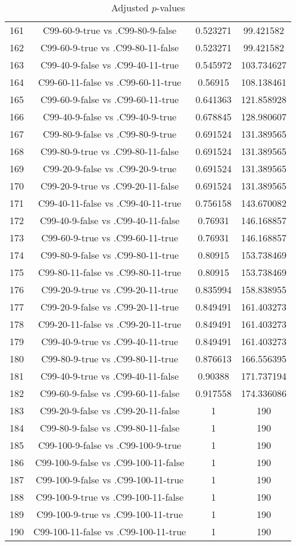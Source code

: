 \documentclass[a4paper,10pt]{article}
\begin{document}
\begin{landscape}
\begin{table}[!htp]
\begin{tabular}{cccc}
161&C99-60-9-true vs .C99-80-9-false&0.523271&99.421582\\
162&C99-60-9-true vs .C99-80-11-false&0.523271&99.421582\\
163&C99-40-9-false vs .C99-40-11-true&0.545972&103.734627\\
164&C99-60-11-false vs .C99-60-11-true&0.56915&108.138461\\
165&C99-60-9-false vs .C99-60-11-true&0.641363&121.858928\\
166&C99-40-9-false vs .C99-40-9-true&0.678845&128.980607\\
167&C99-80-9-false vs .C99-80-9-true&0.691524&131.389565\\
168&C99-80-9-true vs .C99-80-11-false&0.691524&131.389565\\
169&C99-20-9-false vs .C99-20-9-true&0.691524&131.389565\\
170&C99-20-9-true vs .C99-20-11-false&0.691524&131.389565\\
171&C99-40-11-false vs .C99-40-11-true&0.756158&143.670082\\
172&C99-40-9-false vs .C99-40-11-false&0.76931&146.168857\\
173&C99-60-9-true vs .C99-60-11-true&0.76931&146.168857\\
174&C99-80-9-false vs .C99-80-11-true&0.80915&153.738469\\
175&C99-80-11-false vs .C99-80-11-true&0.80915&153.738469\\
176&C99-20-9-true vs .C99-20-11-true&0.835994&158.838955\\
177&C99-20-9-false vs .C99-20-11-true&0.849491&161.403273\\
178&C99-20-11-false vs .C99-20-11-true&0.849491&161.403273\\
179&C99-40-9-true vs .C99-40-11-true&0.849491&161.403273\\
180&C99-80-9-true vs .C99-80-11-true&0.876613&166.556395\\
181&C99-40-9-true vs .C99-40-11-false&0.90388&171.737194\\
182&C99-60-9-false vs .C99-60-11-false&0.917558&174.336086\\
183&C99-20-9-false vs .C99-20-11-false&1&190\\
184&C99-80-9-false vs .C99-80-11-false&1&190\\
185&C99-100-9-false vs .C99-100-9-true&1&190\\
186&C99-100-9-false vs .C99-100-11-false&1&190\\
187&C99-100-9-false vs .C99-100-11-true&1&190\\
188&C99-100-9-true vs .C99-100-11-false&1&190\\
189&C99-100-9-true vs .C99-100-11-true&1&190\\
190&C99-100-11-false vs .C99-100-11-true&1&190\\
\hline
\end{tabular}
\caption{Adjusted $p$-values}
\end{table}

\end{landscape}
\end{document}
